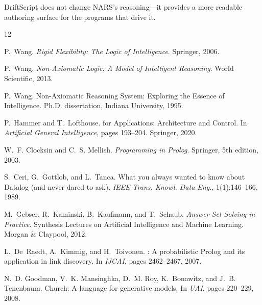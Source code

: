 \documentclass[11pt,a4paper]{article}
\begin{document}
DriftScript does not change NARS's reasoning---it provides a more readable
authoring surface for the programs that drive it.




\begin{thebibliography}{12}

P.~Wang.
\newblock \emph{Rigid Flexibility: The Logic of Intelligence}.
\newblock Springer, 2006.

P.~Wang.
\newblock \emph{Non-Axiomatic Logic: A Model of Intelligent Reasoning}.
\newblock World Scientific, 2013.

P.~Wang.
\newblock Non-Axiomatic Reasoning System: Exploring the Essence of
  Intelligence.
\newblock Ph.D. dissertation, Indiana University, 1995.

P.~Hammer and T.~Lofthouse.
 for Applications: Architecture and Control.
\newblock In \emph{Artificial General Intelligence}, pages 193--204. Springer,
  2020.

W.~F. Clocksin and C.~S. Mellish.
\newblock \emph{Programming in Prolog}.
\newblock Springer, 5th edition, 2003.

S.~Ceri, G.~Gottlob, and L.~Tanca.
\newblock What you always wanted to know about {Datalog} (and never dared to
  ask).
\newblock \emph{IEEE Trans. Knowl. Data Eng.}, 1(1):146--166, 1989.

M.~Gebser, R.~Kaminski, B.~Kaufmann, and T.~Schaub.
\newblock \emph{Answer Set Solving in Practice}.
\newblock Synthesis Lectures on Artificial Intelligence and Machine Learning.
  Morgan \& Claypool, 2012.

L.~De~Raedt, A.~Kimmig, and H.~Toivonen.
: A probabilistic {Prolog} and its application in link
  discovery.
\newblock In \emph{IJCAI}, pages 2462--2467, 2007.

N.~D. Goodman, V.~K. Mansinghka, D.~M. Roy, K.~Bonawitz, and J.~B.
  Tenenbaum.
\newblock Church: A language for generative models.
\newblock In \emph{UAI}, pages 220--229, 2008.


\end{thebibliography}
\end{document}
